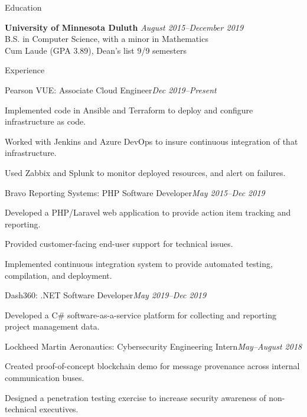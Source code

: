 \documentclass{resume} %
\begin{document}
\begin{rSection}{Education}

    {\bf University of Minnesota Duluth} \hfill {\em August 2015--December 2019} 
    \\ B.S. in Computer Science, with a minor in Mathematics
    \\ Cum Laude (GPA 3.89), Dean's list 9/9 semesters

\end{rSection}

\begin{rSection}{Experience}

    \begin{rSubsection}{Pearson VUE: \textnormal{Associate Cloud Engineer}}{\em Dec 2019--Present}{}{}
        \item Implemented code in Ansible and Terraform to deploy and configure infrastructure as code.
        \item Worked with Jenkins and Azure DevOps to insure continuous integration of that infrastructure.
        \item Used Zabbix and Splunk to monitor deployed resources, and alert on failures.
    \end{rSubsection}

    \begin{rSubsection}{Bravo Reporting Systems: \textnormal{PHP Software Developer}}{\em May 2015--Dec 2019}{}{}
        \item Developed a PHP/Laravel web application to provide action item
            tracking and reporting.
        \item Provided customer-facing end-user support for technical issues.
        \item Implemented continuous integration system to provide automated testing,
            compilation, and deployment.
    \end{rSubsection}

    \begin{rSubsection}{Dash360: \textnormal{.NET Software Developer}}{\em May 2019--Dec 2019}{}{}
        \item Developed a C\# software-as-a-service platform for collecting and
            reporting project management data.
    \end{rSubsection}

    \begin{rSubsection}{Lockheed Martin Aeronautics: \textnormal{Cybersecurity Engineering Intern}}{\em May--August 2018}{}{}
        \item Created proof-of-concept blockchain demo for message provenance across internal communication buses.
        \item Designed a penetration testing exercise to increase security awareness of non-technical executives.
    \end{rSubsection}


\end{rSection}
\end{document}
